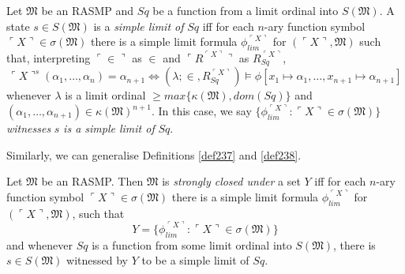 \documentclass[12pt]{article}
\numberwithin{equation}{section}
\begin{document}
\begin{defi}\label{def256}
Let $\mathfrak{M}$ be an RASMP and $Sq$ be a function from a limit ordinal into $S(\mathfrak{M})$. A state $s \in S(\mathfrak{M})$ is a \emph{simple limit of} $Sq$ iff for each $n$-ary function symbol $\ulcorner X \urcorner \in \sigma(\mathfrak{M})$ there is a simple limit formula $\phi_{lim}^{\ulcorner X \urcorner}$ for $(\ulcorner X \urcorner, \mathfrak{M})$ such that, interpreting $\ulcorner \in \urcorner$ as $\in$ and $\ulcorner R^{\ulcorner X \urcorner} \urcorner$ as $R_{Sq}^{\ulcorner X \urcorner}$, 
\begin{equation*}
    \ulcorner X \urcorner^s (\alpha_1, \dots, \alpha_n) = \alpha_{n+1} \iff (\lambda; \in, R_{Sq}^{\ulcorner X \urcorner}) \models \phi[x_1 \mapsto \alpha_1, \dots, x_{n+1} \mapsto \alpha_{n+1}]
\end{equation*}
whenever $\lambda$ is a limit ordinal $\geq max\{\kappa(\mathfrak{M}), dom(Sq)\}$ and $(\alpha_1, \dots, \alpha_{n+1}) \in \kappa(\mathfrak{M})^{n+1}$. In this case, we say $\{\phi_{lim}^{\ulcorner X \urcorner} : \ulcorner X \urcorner \in \sigma(\mathfrak{M})\}$ \emph{witnesses} $s$ \emph{is a simple limit of} $Sq$.
\end{defi}

Similarly, we can generalise Definitions \ref{def237} and \ref{def238}.

\begin{defi}\label{def257}
Let $\mathfrak{M}$ be an RASMP. Then $\mathfrak{M}$ is \emph{strongly closed under} a set $Y$ iff for each $n$-ary function symbol $\ulcorner X \urcorner \in \sigma(\mathfrak{M})$ there is a simple limit formula $\phi_{lim}^{\ulcorner X \urcorner}$ for $(\ulcorner X \urcorner, \mathfrak{M})$, such that 
\begin{equation*}
    Y = \{\phi_{lim}^{\ulcorner X \urcorner} : \ulcorner X \urcorner \in \sigma(\mathfrak{M})\}
\end{equation*}
and whenever $Sq$ is a function from some limit ordinal into $S(\mathfrak{M})$, there is $s \in S(\mathfrak{M})$ witnessed by $Y$ to be a simple limit of $Sq$.
\end{defi}
\end{document}
